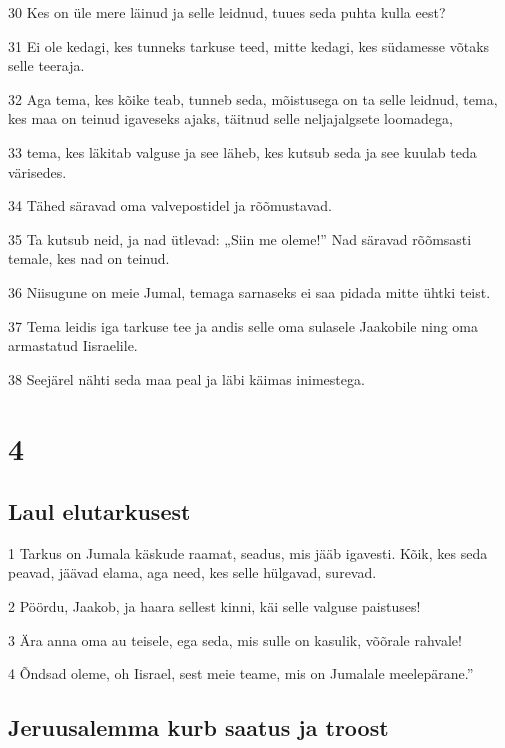 \par 30 Kes on üle mere läinud ja selle leidnud, tuues seda puhta kulla eest?
\par 31 Ei ole kedagi, kes tunneks tarkuse teed, mitte kedagi, kes südamesse võtaks selle teeraja.
\par 32 Aga tema, kes kõike teab, tunneb seda, mõistusega on ta selle leidnud, tema, kes maa on teinud igaveseks ajaks, täitnud selle neljajalgsete loomadega,
\par 33 tema, kes läkitab valguse ja see läheb, kes kutsub seda ja see kuulab teda värisedes.
\par 34 Tähed säravad oma valvepostidel ja rõõmustavad.
\par 35 Ta kutsub neid, ja nad ütlevad: „Siin me oleme!” Nad säravad rõõmsasti temale, kes nad on teinud.
\par 36 Niisugune on meie Jumal, temaga sarnaseks ei saa pidada mitte ühtki teist.
\par 37 Tema leidis iga tarkuse tee ja andis selle oma sulasele Jaakobile ning oma armastatud Iisraelile.
\par 38 Seejärel nähti seda maa peal ja läbi käimas inimestega.

\chapter{4}

\section*{Laul elutarkusest}

\par 1 Tarkus on Jumala käskude raamat, seadus, mis jääb igavesti. Kõik, kes seda peavad, jäävad elama, aga need, kes selle hülgavad, surevad.
\par 2 Pöördu, Jaakob, ja haara sellest kinni, käi selle valguse paistuses!
\par 3 Ära anna oma au teisele, ega seda, mis sulle on kasulik, võõrale rahvale!
\par 4 Õndsad oleme, oh Iisrael, sest meie teame, mis on Jumalale meelepärane.”

\section*{Jeruusalemma kurb saatus ja troost}

